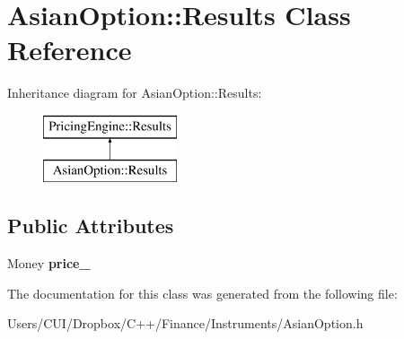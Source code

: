 \hypertarget{class_asian_option_1_1_results}{}\section{Asian\+Option\+:\+:Results Class Reference}
\label{class_asian_option_1_1_results}
Inheritance diagram for Asian\+Option\+:\+:Results\+:\begin{figure}[H]
\begin{center}
\leavevmode
\includegraphics[height=2.000000cm]{class_asian_option_1_1_results}
\end{center}
\end{figure}
\subsection*{Public Attributes}
\begin{DoxyCompactItemize}
\item 
\hypertarget{class_asian_option_1_1_results_a9e4e4e2612f105b940b1562d7f126a89}{}\label{class_asian_option_1_1_results_a9e4e4e2612f105b940b1562d7f126a89} 
Money {\bfseries price\+\_\+}
\end{DoxyCompactItemize}


The documentation for this class was generated from the following file\+:\begin{DoxyCompactItemize}
\item 
Users/\+C\+U\+I/\+Dropbox/\+C++/\+Finance/\+Instruments/Asian\+Option.\+h\end{DoxyCompactItemize}
